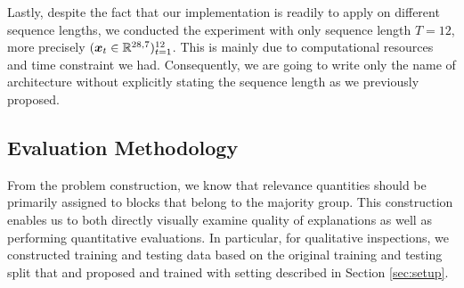 
\begin{figure}[!htb]
\centering

     \hfill

\label{fig:deep_conv_arch}
\end{figure}

Lastly, despite the fact that  our implementation is readily to apply on different sequence lengths,  we conducted the experiment with only sequence length $T=12$, more precisely $(\boldsymbol{x}_t \in \mathbb{R}^{28,7})_{t=1}^{12}$. This is mainly due to computational resources and time constraint we had. Consequently, we are going to write only the name of architecture without explicitly stating the sequence length as we previously proposed.


\subsection{Evaluation Methodology}
\label{sec:evaluation_med}
From the problem construction, we know that relevance quantities should  be primarily assigned to blocks that belong to the majority group. This construction enables us to both directly visually examine quality of explanations as well as performing quantitative evaluations.  In particular, for qualitative inspections, we constructed training and testing data based on the original training and testing split that \cite{LeCunMNISThandwrittendigit2010} and \cite{XiaoFashionMNISTNovelImage2017} proposed and trained with setting described in Section \ref{sec:setup}. 

